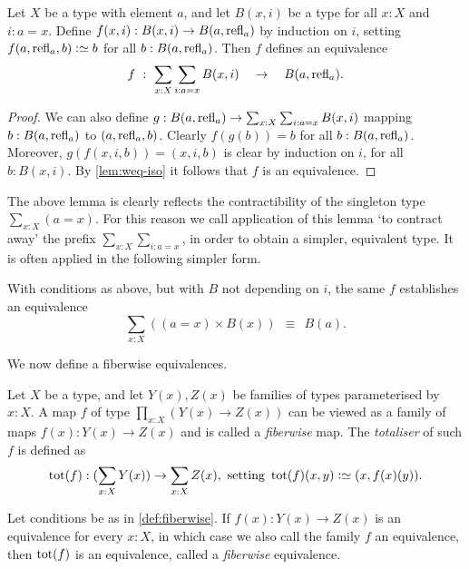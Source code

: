 \begin{lemma}\label{lem:contract-away}
Let $X$ be a type with element $a$, and let
$B(x,i)$ be a type for all $x:X$ and $i: a=x$.
Define $f(x,i): B(x,i) \to B(a,\refl{a})$ by induction on $i$,
setting $f(a,\refl{a},b) \defeq b$ for all $b:B(a,\refl{a})$.
Then $f$ defines an equivalence 
\[
f~:~ \sum_{x:X} \sum_{i: a=x} B(x,i) \quad \to \quad B(a,\refl{a}).
\]
\end{lemma}
\begin{proof}
We can also define 
$g: B(a,\refl{a})\to \sum_{x:X} \sum_{i: a=x} B(x,i)$
mapping $b: B(a,\refl{a})$ to $(a,\refl{a},b)$.
Clearly $f(g(b))=b$ for all $b:B(a,\refl{a})$.
Moreover, $g(f(x,i,b))=(x,i,b)$ is clear by induction
on $i$, for all $b:B(x,i)$.
By \cref{lem:weq-iso} it follows that $f$
is an equivalence.
\end{proof}

The above lemma is clearly reflects the  contractibility of the
singleton type $\sum_{x:X}(a=x)$. For this reason
we call application of this lemma `to contract away'
the prefix $\sum_{x:X} \sum_{i: a=x}$, in order
to obtain a simpler, equivalent type. It is often applied
in the following simpler form.

\begin{corollary}\label{cor:contract-away}
With conditions as above, but with $B$ not depending on $i$, the same $f$
establishes an equivalence
\[
 \sum_{x:X} ((a=x)\times B(x))~~\equiv~~B(a).
\]
\end{corollary}

We now define  a fiberwise equivalences.

\begin{definition}\label{def:fiberwise}
Let $X$ be a type, and let $Y(x),Z(x)$ be families of types parameterised
by $x:X$. A map $f$ of type $\prod_{x:X}(Y(x)\to Z(x))$
can be viewed as a family of maps $f(x): Y(x)\to Z(x)$ and is called a 
\emph{fiberwise} map. The \emph{totaliser} of such $f$ is defined as
\[
\tot(f) : (\sum_{x:X} Y(x)) \to \sum_{x:X} Z(x),
\text{ setting } \tot(f)(x,y)\defeq (x,f(x)(y)).
\]

\end{definition}

\begin{lemma}\label{lem:fiberwise}
Let conditions be as in \cref{def:fiberwise}.
If $f(x): Y(x) \to Z(x)$ is an equivalence for every $x:X$,
in which case we also call the family $f$ an equivalence,
then $\tot(f)$ is an equivalence,
called a \emph{fiberwise} equivalence.
\end{lemma}

